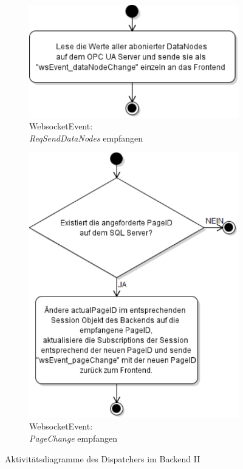 \begin{figure}[ht]
  \begin{subfigure}[b]{0.4875\textwidth}
    \centering
    \includegraphics[width=\textwidth]{content/hauptteil/systemEntwurf/res/wsHandler/backend/wsEvent_reqSendDataNodes.pdf}
    \caption{WebsocketEvent:\\\emph{ReqSendDataNodes} empfangen}
    \label{fig:aDDB:wsEvent_reqSendDataNodes}
  \end{subfigure}
  \hfill
  \begin{subfigure}[b]{0.5025\textwidth}
    \centering
    \includegraphics[width=\textwidth]{content/hauptteil/systemEntwurf/res/wsHandler/backend/wsEvent_pageChange.pdf}
    \caption{WebsocketEvent:\\\emph{PageChange} empfangen}
    \label{fig:aDDB:wsEvent_pageChange}
  \end{subfigure}
  \caption[Aktivitätsdiagramm Dispatcher Backend II]{Aktivitätsdiagramme des Dispatchers im Backend II}
  \label{fig:activityDiagramDispatcherBackendII}
\end{figure}

